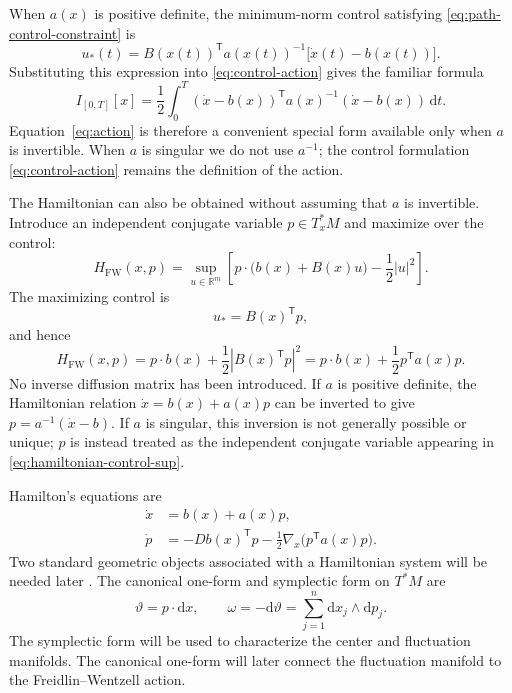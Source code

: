 \documentclass[11pt]{article}
\theoremstyle{definition}
\theoremstyle{remark}
\newcommand{\R}{\mathbb{R}}
\newcommand{\Hs}{H_{\mathrm{FW}}}
\newcommand{\dd}{\mathrm{d}}
\newcommand{\cT}{\mathsf{T}}
\begin{document}
When $a(x)$ is positive definite, the minimum-norm control satisfying \eqref{eq:path-control-constraint} is
\begin{equation}
u_*(t)=B(x(t))^{\cT}a(x(t))^{-1}
\bigl[\dot x(t)-b(x(t))\bigr].
\label{eq:min-control-full-rank}
\end{equation}
Substituting this expression into \eqref{eq:control-action} gives the familiar formula
\begin{equation}
I_{[0,T]}[x]
=\frac12\int_0^T
(\dot x-b(x))^{\cT}a(x)^{-1}(\dot x-b(x))\,\dd t.
\label{eq:action}
\end{equation}
Equation~\eqref{eq:action} is therefore a convenient special form available only when $a$ is invertible.  When $a$ is singular we do not use $a^{-1}$; the control formulation \eqref{eq:control-action} remains the definition of the action.

The Hamiltonian can also be obtained without assuming that $a$ is invertible.  Introduce an independent conjugate variable $p\in T_x^*M$ and maximize over the control:
\begin{equation}
\Hs(x,p)
=
\sup_{u\in\R^m}
\left[
 p\cdot\bigl(b(x)+B(x)u\bigr)-\frac12|u|^2
\right].
\label{eq:hamiltonian-control-sup}
\end{equation}
The maximizing control is
\begin{equation}
u_*=B(x)^{\cT}p,
\label{eq:optimal-control-p}
\end{equation}
and hence
\begin{equation}
\Hs(x,p)=p\cdot b(x)+\frac12|B(x)^{\cT}p|^2
=p\cdot b(x)+\frac12p^{\cT}a(x)p.
\label{eq:legendre}
\end{equation}
No inverse diffusion matrix has been introduced.  If $a$ is positive definite, the Hamiltonian relation $\dot x=b(x)+a(x)p$ can be inverted to give $p=a^{-1}(\dot x-b)$.  If $a$ is singular, this inversion is not generally possible or unique; $p$ is instead treated as the independent conjugate variable appearing in \eqref{eq:hamiltonian-control-sup}.

Hamilton's equations are
\begin{align}
\dot x&=b(x)+a(x)p,
\label{eq:ham-x}\\
\dot p&=-Db(x)^{\cT}p-\frac12\nabla_x\bigl(p^{\cT}a(x)p\bigr).
\label{eq:ham-p}
\end{align}
Two standard geometric objects associated with a Hamiltonian system will be needed later \cite{MarsdenRatiu1999}.  The canonical one-form and symplectic form on $T^*M$ are
\begin{equation}
\vartheta=p\cdot\dd x,
\qquad
\omega=-\dd\vartheta=\sum_{j=1}^n \dd x_j\wedge\dd p_j.
\label{eq:canonical-forms}
\end{equation}
The symplectic form will be used to characterize the center and fluctuation manifolds.  The canonical one-form will later connect the fluctuation manifold to the Freidlin--Wentzell action.
\end{document}

